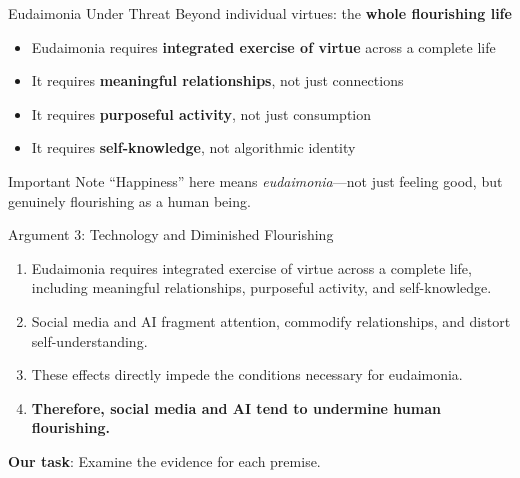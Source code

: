 ﻿\documentclass[aspectratio=169,11pt]{beamer}
\begin{document}
\begin{frame}{Eudaimonia Under Threat}
Beyond individual virtues: the \textbf{whole flourishing life}

\begin{itemize}
    \item Eudaimonia requires \textbf{integrated exercise of virtue} across a complete life
    \item It requires \textbf{meaningful relationships}, not just connections
    \item It requires \textbf{purposeful activity}, not just consumption
    \item It requires \textbf{self-knowledge}, not algorithmic identity
\end{itemize}

\vspace{0.4cm}
\begin{alertblock}{Important Note}
``Happiness'' here means \textit{eudaimonia}---not just feeling good, but genuinely flourishing as a human being.
\end{alertblock}
\end{frame}

\begin{frame}{Argument 3: Technology and Diminished Flourishing}
\begin{argumentbox}
\begin{enumerate}
    \item Eudaimonia requires integrated exercise of virtue across a complete life, including meaningful relationships, purposeful activity, and self-knowledge.
    \item Social media and AI fragment attention, commodify relationships, and distort self-understanding.
    \item These effects directly impede the conditions necessary for eudaimonia.
    \item[\textbf{C.}] \textbf{Therefore, social media and AI tend to undermine human flourishing.}
\end{enumerate}
\end{argumentbox}

\vspace{0.3cm}
\textbf{Our task}: Examine the evidence for each premise.
\end{frame}
\end{document}
